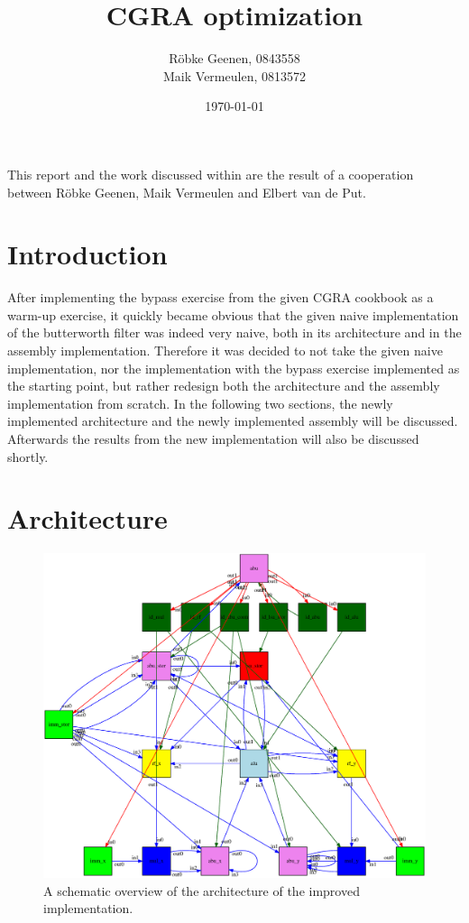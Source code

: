 \documentclass[10pt,twocolumn]{article}
\title{\textbf{CGRA optimization}}
\author{R\"{o}bke Geenen, 0843558\\Maik Vermeulen, 0813572}
\date{\today}
\begin{document}
\maketitle

This report and the work discussed within are the result of a
cooperation between R\"{o}bke Geenen, Maik Vermeulen and Elbert van de
Put.

\section{Introduction}
\label{sec:introduction}
After implementing the bypass exercise from the given CGRA cookbook as
a warm-up exercise, it quickly became obvious that the given naive
implementation of the butterworth filter was indeed very naive, both
in its architecture and in the assembly implementation. Therefore it
was decided to not take the given naive implementation, nor the
implementation with the bypass exercise implemented as the starting
point, but rather redesign both the architecture and the assembly
implementation from scratch. In the following two sections, the newly
implemented architecture and the newly implemented assembly will be
discussed. Afterwards the results from the new implementation will
also be discussed shortly.


\section{Architecture}
\label{sec:architecture}
\begin{figure}[ht]
  \centering
  \includegraphics[width=\linewidth]{architecture.eps}
  \caption{A schematic overview of the architecture of the improved
    implementation.}
  \label{fig:architecture}
\end{figure}
\end{document}
